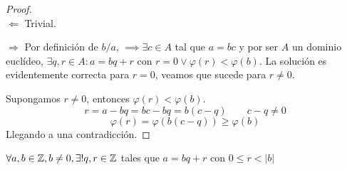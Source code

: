 \begin{proof}\hfill\\

    $\boxed{\Longleftarrow}$ Trivial.

  $\boxed{\Longrightarrow}$ Por definición de $b/a$, $\implies \exists c \in A$ tal que $a=bc$ y por ser $A$ un dominio euclídeo, $\exists q,r \in A : a = bq + r $
  con $r=0 \vee \varphi(r) < \varphi(b)$. La solución 	es evidentemente correcta para $r = 0$, veamos que sucede para $r \neq 	0$.

    Supongamos $r \neq 0$, entonces $\varphi(r) < \varphi(b)$.
    $$r = a - bq = bc - bq = b(c-q) \quad \quad c-q \neq 0$$
    $$\varphi(r) = \varphi(b(c-q)) \ge \varphi(b)$$
    Llegando a una contradicción.

\end{proof}

\begin{nth}

	$\forall a,b \in \mathbb{Z}, b \neq 0, \exists !q,r \in \mathbb{Z}$ tales que $a = bq + r $ con $0 \le r < |b|$
\end{nth}


